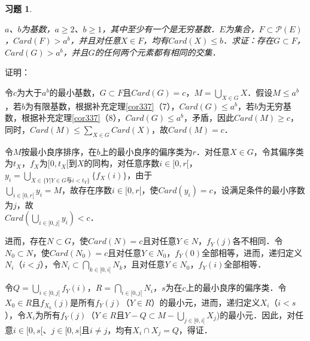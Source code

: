 \documentclass[12pt, a4paper, oneside]{book}
\newtheorem{exer}{习题}
\begin{document}
			\begin{exer}\label{exer188}
				\hfill\par
				$a$、$b$为基数，$a\geq 2$、$b\geq 1$，其中至少有一个是无穷基数．$E$为集合，$F\subset \mathcal{P}(E)$，$Card(F)>a^b$，并且对任意$X\in F$，均有$Card(X)\leq b$．求证：存在$G\subset F$，$Card(G)>a^b$，并且$G$的任何两个元素都有相同的交集．
			\end{exer}
			证明：
			\par
			令$c$为大于$a^b$的最小基数，$G\subset F$且$Card(G)=c$，$M=\bigcup\limits_{X\in G}X$．假设$M\leq a^b$，若$b$为有限基数，根据补充定理\ref{cor337}（7），$Card(G)\leq a^b$，若$b$为无穷基数，根据补充定理\ref{cor337}（8），$Card(G)\leq a^b$，矛盾，因此$Card(M)\geq c$，同时，$Card(M)\leq \sum\limits_{X\in G}Card(X)$，故$Card(M)=c$．
			\par
			令$M$按最小良序排序，在$b$上的最小良序的偏序类为$r$．对任意$X\in G$，令其偏序类为$t_X$，$f_X$为$[0, t_X[$到$X$的同构，对任意序数$i\in [0, r[$，$y_i=\bigcup\limits_{X\in \{Y|Y\in G\text{与}i<t_Y\}}\{f_X(i)\}$，由于\\$\bigcup\limits_{i\in [0, r[}y_i=M$，故存在序数$i\in [0, r[$，使$Card(y_i)=c$，设满足条件的最小序数为$j$，故\\$Card(\bigcup\limits_{i\in [0, j[}y_i)<c$．
			\par
			进而，存在$N\subset G$，使$Card(N)=c$且对任意$Y\in N$，$f_Y(j)$各不相同．令$N_0\subset N$，使$Card(N_0)=c$且对任意$Y\in N_0$，$f_Y(0)$全部相等，进而，递归定义$N_i$（$i<j$），令$N_i\subset \bigcap\limits_{k\in [0, i[}N_k$，且对任意$Y\in N_0$，$f_Y(i)$全部相等．
			\par
			令$Q=\bigcup\limits_{i\in [0, j[}f_Y(i)$，$R=\bigcap\limits_{i\in [0, j[}N_i$，$s$为在$c$上的最小良序的偏序类．令$X_0\in R$且$f_{X_0}(j)$是所有$f_Y(j)$（$Y\in R$）的最小元，进而，递归定义$X_i$（$i<s$），令$X_i$为所有$f_Y(j)$（$Y\in R$且$Y-Q\subset M-\bigcup\limits_{j\in [0, i[}X_j$)的最小元．因此，对任意$i\in [0, s[$、$j\in [0, s[$且$i\neq j$，均有$X_i\cap X_j=Q$，得证．
\end{document}
